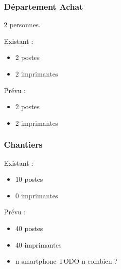         \subsubsection{Département Achat}
            2 personnes.

            Existant :
                \begin{itemize}
                    \item 2 postes
                    \item 2 imprimantes
                \end{itemize}
            Prévu :
                \begin{itemize}
                    \item 2 postes 
                    \item 2 imprimantes
                \end{itemize}

        \subsubsection{Chantiers}

            Existant :
                \begin{itemize}
                    \item 10 postes
                    \item 0 imprimantes
                \end{itemize}
            Prévu :
                \begin{itemize}
                    \item 40 postes
                    \item 40 imprimantes
                    \item n smartphone TODO n combien ?
                \end{itemize}
    
